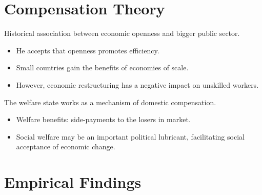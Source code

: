\documentclass[
]{book}
\begin{document}
\hypertarget{compensation-theory}{%
\section{Compensation Theory}\label{compensation-theory}}

Historical association between economic openness and bigger public sector.

\begin{itemize}
\item
  He accepts that openness promotes efficiency.
\item
  Small countries gain the benefits of economies of scale.
\item
  However, economic restructuring has a negative impact on unskilled workers.
\end{itemize}

The welfare state works as a mechanism of domestic compensation.

\begin{itemize}
\item
  Welfare benefits: side-payments to the losers in market.
\item
  Social welfare may be an important political lubricant, facilitating social acceptance of economic change.
\end{itemize}

\hypertarget{empirical-findings}{%
\section{Empirical Findings}\label{empirical-findings}}
\end{document}
